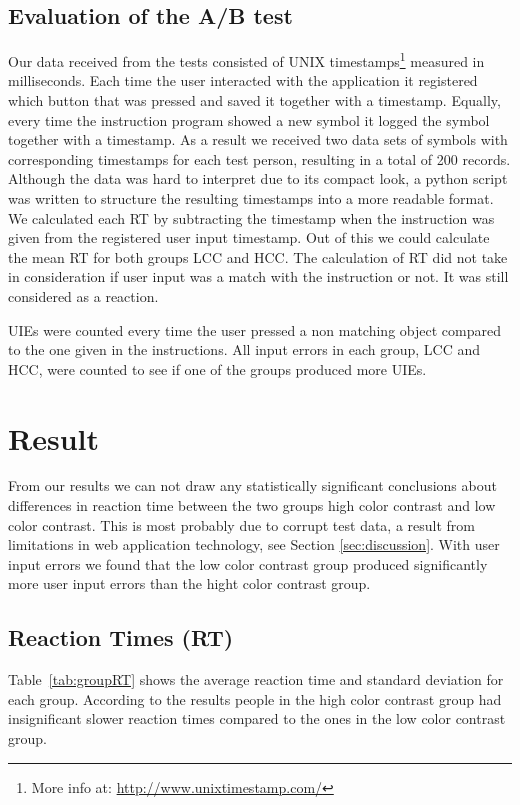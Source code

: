 \documentclass[runningheads,a4paper]{llncs}
\begin{document}
\subsection{Evaluation of the A/B test}
Our data received from the tests consisted of UNIX timestamps\footnote{More info at: \url{http://www.unixtimestamp.com/}} measured in milliseconds. Each time the user interacted with the application it registered which button that was pressed and saved it together with a timestamp. Equally, every time the instruction program showed a new symbol it logged the symbol together with a timestamp. As a result we received two data sets of symbols with corresponding timestamps for each test person, resulting in a total of 200 records. Although the data was hard to interpret due to its compact look, a python script was written to structure the resulting timestamps into a more readable format. We calculated each RT by subtracting the timestamp when the instruction was given from the registered user input timestamp. Out of this we could calculate the mean RT for both groups LCC and HCC. The calculation of RT did not take in consideration if user input was a match with the instruction or not. It was still considered as a reaction.

UIEs were counted every time the user pressed a non matching object compared to the one given in the instructions. All input errors in each group, LCC and HCC, were counted to see if one of the groups produced more UIEs.

\section{Result}
From our results we can not draw any statistically significant conclusions about differences in reaction time between the two groups high color contrast and low color contrast. This is most probably due to corrupt test data, a result from limitations in web application technology, see Section \ref{sec:discussion}. With user input errors we found that the low color contrast group produced significantly more user input errors than the hight color contrast group.

\subsection{Reaction Times (RT)}
Table~\ref{tab:groupRT} shows the average reaction time and standard deviation for each group. According to the results people in the high color contrast group had insignificant slower reaction times compared to the ones in the low color contrast group.
\end{document}
